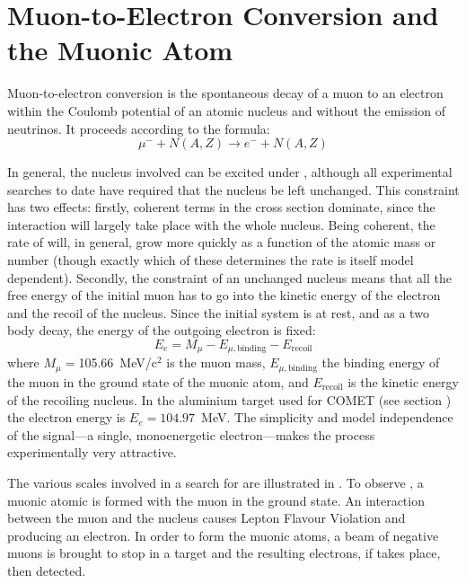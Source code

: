 
\chapter{Muon-to-Electron Conversion and the Muonic Atom}
Muon-to-electron conversion is the spontaneous decay of a muon to an electron within the Coulomb potential of an atomic nucleus and without the emission of neutrinos.
It proceeds according to the formula:
\begin{equation}
\mu^{-}+N(A,Z) \rightarrow e^{-}+N(A,Z)
\end{equation}

In general, the nucleus involved can be excited under \mueconv, although all experimental searches to date have required that the nucleus be left unchanged.
This constraint has two effects: firstly, coherent terms in the \mueconv cross section dominate, since the interaction will largely take place with the whole nucleus.
Being coherent, the rate of \mueconv will, in general, grow more quickly as a function of the atomic mass or number (though exactly which of these determines the rate is itself model dependent).
Secondly, the constraint of an unchanged nucleus means that all the free energy of the initial muon has to go into the kinetic energy of the electron and the recoil of the nucleus.
Since the initial system is at rest, and as a two body decay, the energy of the outgoing electron is fixed:
\begin{equation}
E_e=M_\mu-E_{\mu,\mathrm{binding}}-E_\mathrm{recoil}
\end{equation}
where $M_\mu=$105.66~MeV/c$^2$ is the muon mass, $E_{\mu,\mathrm{binding}}$ the
binding energy of the muon in the ground state of the muonic atom, and
$E_\mathrm{recoil}$ is the kinetic energy of the recoiling nucleus.
In the aluminium target used for COMET (see section ) the electron energy is $E_e=104.97$~MeV.
The simplicity and model independence of the signal---a single, monoenergetic electron---makes the process experimentally very attractive.

\FigMuecCreation
The various scales involved in a search for \mueconv are illustrated in .
To observe \mueconv, a muonic atomic is formed with the muon in the ground state.
An interaction between the muon and the nucleus causes Lepton Flavour Violation and producing an electron.
In order to form the muonic atoms, a beam of negative muons is brought to stop in a target and the resulting electrons, if \mueconv takes place, then detected.

